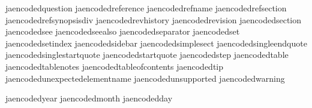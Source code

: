    jaencodedquestion              {}
   jaencodedreference             {}
   jaencodedrefname               {}
   jaencodedrefsection            {}
   jaencodedrefsynopsisdiv        {}
   jaencodedrevhistory            {}
   jaencodedrevision              {}
   jaencodedsection               {}
   jaencodedsee                   {}
   jaencodedseealso               {}
   jaencodedseparator             {}
   jaencodedset                   {}
   jaencodedsetindex              {}
   jaencodedsidebar               {}
   jaencodedsimplesect            {}
   jaencodedsingleendquote        {}
   jaencodedsinglestartquote      {}
   jaencodedstartquote            {}
   jaencodedstep                  {}
   jaencodedtable                 {}
   jaencodedtablenotes            {}
   jaencodedtableofcontents       {}
   jaencodedtip                   {}
   jaencodedunexpectedelementname {}
   jaencodedunsupported           {}
   jaencodedwarning               {}

   jaencodedyear                  {}
   jaencodedmonth                 {}
   jaencodedday                   {}

\stopencoding

